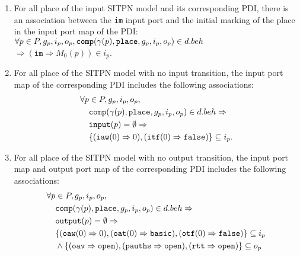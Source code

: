 \begin{definition}
\begin{enumerate}
  \item For all place of the input SITPN model and its corresponding PDI, there is an association between the \texttt{im} input port and the initial marking of the place in the input port map of the PDI:\\
    $\forall{}p\in{}P,g_p,i_p,o_p,\mathtt{comp}(\gamma(p),\mathtt{place},g_p,i_p,o_p)\in{}d.beh{}$
    $\Rightarrow(\mathtt{im}\Rightarrow{}M_0(p))\in{}i_p$.
    
  \item For all place of the SITPN model with no input transition, the
    input port map of the corresponding PDI includes the following associations:
    \begin{equation*}
      \begin{aligned}
        \forall{}p&\in{}P,g_p,i_p,o_p, \\
                  & \mathtt{comp}(\gamma(p),\mathtt{place},g_p,i_p,o_p)\in{}d.beh\Rightarrow \\
                  & \mathtt{input}(p)=\emptyset\Rightarrow \\
                  & \{(\mathtt{iaw}(0)\Rightarrow{}0), (\mathtt{itf}(0)\Rightarrow{}\mathtt{false})\}\subseteq{}i_p.\\
      \end{aligned}
    \end{equation*}

  \item For all place of the SITPN model with no output transition,
    the input port map and output port map of the corresponding PDI
    includes the following associations:
    \begin{equation*}
      \begin{aligned}
        \forall{}p&\in{}P,g_p,i_p,o_p, \\
                  & \mathtt{comp}(\gamma(p),\mathtt{place},g_p,i_p,o_p)\in{}d.beh\Rightarrow \\
                  & \mathtt{output}(p)=\emptyset\Rightarrow \\
                  & \{(\mathtt{oaw}(0)\Rightarrow{}0), (\mathtt{oat}(0)\Rightarrow{}\mathtt{basic}),
                    (\mathtt{otf}(0)\Rightarrow{}\mathtt{false})\}\subseteq{}i_p\\
                  & \land\{(\mathtt{oav}\Rightarrow{}\mathtt{open}), (\mathtt{pauths}\Rightarrow{}\mathtt{open}),
                    (\mathtt{rtt}\Rightarrow{}\mathtt{open})\}\subseteq{}o_p \\
      \end{aligned}
    \end{equation*}


\end{enumerate}
\end{definition}
